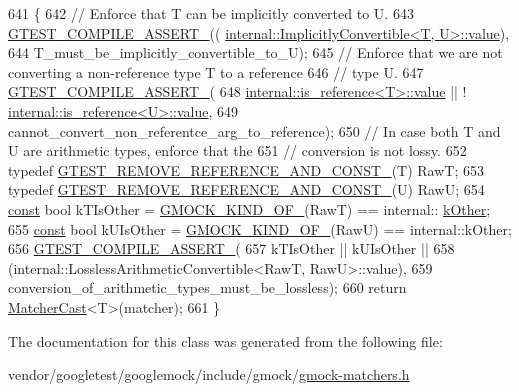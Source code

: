 \begin{DoxyCode}
641                                                            \{
642     \textcolor{comment}{// Enforce that T can be implicitly converted to U.}
643     \hyperlink{gtest-port_8h_ae1f37dc71d5daa6fb49ca1b6047d4a8c}{GTEST\_COMPILE\_ASSERT\_}((
      \hyperlink{classtesting_1_1internal_1_1ImplicitlyConvertible_aea51cecabca681fb75659e224771b7b7}{internal::ImplicitlyConvertible<T, U>::value}),
644                           T\_must\_be\_implicitly\_convertible\_to\_U);
645     \textcolor{comment}{// Enforce that we are not converting a non-reference type T to a reference}
646     \textcolor{comment}{// type U.}
647     \hyperlink{gtest-port_8h_ae1f37dc71d5daa6fb49ca1b6047d4a8c}{GTEST\_COMPILE\_ASSERT\_}(
648         \hyperlink{structtesting_1_1internal_1_1bool__constant_a499fba6576296b04d99690a486424b32}{internal::is\_reference<T>::value} || !
      \hyperlink{structtesting_1_1internal_1_1bool__constant_a499fba6576296b04d99690a486424b32}{internal::is\_reference<U>::value},
649         cannot\_convert\_non\_referentce\_arg\_to\_reference);
650     \textcolor{comment}{// In case both T and U are arithmetic types, enforce that the}
651     \textcolor{comment}{// conversion is not lossy.}
652     \textcolor{keyword}{typedef} \hyperlink{gtest-internal_8h_a874567b176266188fabfffb8393267ce}{GTEST\_REMOVE\_REFERENCE\_AND\_CONST\_}(T) RawT;
653     typedef \hyperlink{gtest-internal_8h_a874567b176266188fabfffb8393267ce}{GTEST\_REMOVE\_REFERENCE\_AND\_CONST\_}(U) RawU;
654     \hyperlink{namespaceupload_a985aa9a71de3eb507344df65700c696d}{const} \textcolor{keywordtype}{bool} kTIsOther = \hyperlink{gmock-internal-utils_8h_a72b01bdd08b78e927270885ca880ead4}{GMOCK\_KIND\_OF\_}(RawT) == internal::
      \hyperlink{namespacetesting_1_1internal_aa8747bda20137c9aa7f846dee830e686ad47f29150ab7a9ec8ce2491f44537347}{kOther};
655     \hyperlink{namespaceupload_a985aa9a71de3eb507344df65700c696d}{const} \textcolor{keywordtype}{bool} kUIsOther = \hyperlink{gmock-internal-utils_8h_a72b01bdd08b78e927270885ca880ead4}{GMOCK\_KIND\_OF\_}(RawU) == internal::kOther;
656     \hyperlink{gtest-port_8h_ae1f37dc71d5daa6fb49ca1b6047d4a8c}{GTEST\_COMPILE\_ASSERT\_}(
657         kTIsOther || kUIsOther ||
658         (internal::LosslessArithmeticConvertible<RawT, RawU>::value),
659         conversion\_of\_arithmetic\_types\_must\_be\_lossless);
660     return \hyperlink{namespacetesting_a8234d15eee99b135a7fdf2141a2ebe1f}{MatcherCast}<T>(matcher);
661   \}
\end{DoxyCode}


The documentation for this class was generated from the following file\+:\begin{DoxyCompactItemize}
\item 
vendor/googletest/googlemock/include/gmock/\hyperlink{gmock-matchers_8h}{gmock-\/matchers.\+h}\end{DoxyCompactItemize}
